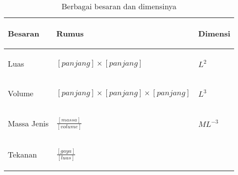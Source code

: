 \documentclass[12pt, a4paper]{article}\usepackage[utf8]{inputenc}
\theoremstyle{plain}
\theoremstyle{plain}
\numberwithin{equation}{section}
\theoremstyle{definition}
\begin{document}
	\begin{center}
		
		\begin{table}[!h]
			\caption{Berbagai besaran dan dimensinya}
			\centering
			
			\begin{tabular}{|p{}|p{}|p{}|}
				\hline 
				\begin{center}
					\textbf{Besaran}
				\end{center}
				& \begin{center}
					\textbf{Rumus}
				\end{center}
				& \begin{center}
					\textbf{Dimensi}
				\end{center}
				\\
				\hline 
				\begin{center}
					Luas
				\end{center}
				& \begin{center}
					$\displaystyle [ panjang] \times [ panjang]$
				\end{center}
				& \begin{center}
					$\displaystyle L^{2}$
				\end{center}
				\\
				\hline 
				\begin{center}
					Volume
				\end{center}
				& \begin{center}
					$\displaystyle [ panjang] \times [ panjang] \times [ panjang]$
				\end{center}
				& \begin{center}
					$\displaystyle L^{3}$
				\end{center}
				\\
				\hline 
				\begin{center}
					Massa Jenis
				\end{center}
				& \begin{center}
					$\displaystyle \frac{[ massa]}{[ volume]}$
				\end{center}
				& \begin{center}
					$\displaystyle ML^{-3}$
				\end{center}
				\\
				\hline 
				\begin{center}
					Tekanan
				\end{center}
				& \begin{center}
					$\displaystyle \frac{[ gaya]}{[ luas]}$

\end{center}
\end{tabular}
\end{table}
\end{center}
\end{document}
